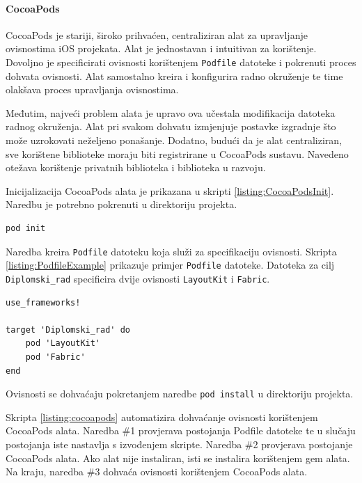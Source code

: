 \documentclass[times, utf8, diplomski, numeric]{fer}
\begin{document}
\paragraph{CocoaPods}

CocoaPods je stariji, široko prihvaćen, centraliziran alat za upravljanje ovisnostima iOS projekata. Alat je jednostavan i intuitivan za korištenje. Dovoljno je specificirati ovisnosti korištenjem \verb|Podfile| datoteke i pokrenuti proces dohvata ovisnosti. Alat samostalno kreira i konfigurira radno okruženje te time olakšava proces upravljanja ovisnostima.

Međutim, najveći problem alata je upravo ova učestala modifikacija datoteka radnog okruženja. Alat pri svakom dohvatu izmjenjuje postavke izgradnje što može uzrokovati neželjeno ponašanje. Dodatno, budući da je alat centraliziran, sve korištene biblioteke moraju biti registrirane u CocoaPods sustavu. Navedeno otežava korištenje privatnih biblioteka i biblioteka u razvoju.

Inicijalizacija CocoaPods alata je prikazana u skripti \ref{listing:CocoaPodsInit}. Naredbu je potrebno pokrenuti u direktoriju projekta.

\begin{lstlisting}[caption=Inicijalizacija CocoaPods alata, label=listing:CocoaPodsInit]
pod init
\end{lstlisting}

Naredba kreira \verb|Podfile| datoteku koja služi za specifikaciju ovisnosti. Skripta \ref{listing:PodfileExample} prikazuje primjer \verb|Podfile| datoteke. Datoteka za cilj \verb|Diplomski_rad| specificira dvije ovisnosti \verb|LayoutKit| i \verb|Fabric|.

\begin{lstlisting}[caption=Primjer Podfile datoteke, label=listing:PodfileExample]
use_frameworks!

target 'Diplomski_rad' do
    pod 'LayoutKit'
    pod 'Fabric'
end
\end{lstlisting}

Ovisnosti se dohvaćaju pokretanjem naredbe \verb|pod install| u direktoriju projekta.

Skripta \ref{listing:cocoapods} automatizira dohvaćanje ovisnosti korištenjem CocoaPods alata. Naredba \#1 provjerava postojanja Podfile datoteke te u slučaju postojanja iste nastavlja s izvođenjem skripte. Naredba \#2 provjerava postojanje CocoaPods alata. Ako alat nije instaliran, isti se instalira korištenjem gem alata. Na kraju, naredba \#3 dohvaća ovisnosti korištenjem CocoaPods alata.
\end{document}
